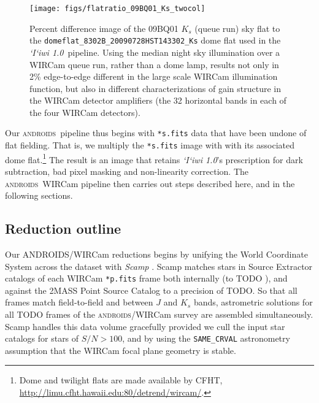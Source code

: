 \documentclass[iop]{emulateapj}
\newcommand{\sw}[1]{\textit{#1}} %
\newcommand{\iiwione}{\sw{`I`iwi 1.0}}
\newcommand{\androids}{\textsc{androids}}
\newcommand{\todo}[1]{\textcolor{BurntOrange}{\textsf{#1}}} %
\begin{document}
\begin{figure}[t]
   \centering
    \texttt{[image: figs/flatratio\_09BQ01\_Ks\_twocol]}
    \caption{Percent difference image of the 09BQ01 $K_s$ (queue run) sky flat to the \texttt{domeflat\_8302B\_20090728HST143302\_Ks} dome flat used in the \iiwione\ pipeline. Using the median night sky illumination over a WIRCam queue run, rather than a dome lamp, results not only in 2\% edge-to-edge different in the large scale WIRCam illumination function, but also in different characterizations of gain structure in the WIRCam detector amplifiers (the 32 horizontal bands in each of the four WIRCam detectors).}
   \label{fig:domeflatratio}
\end{figure}

\vspace{1em}

Our \androids\ pipeline thus begins with \texttt{*s.fits} data that have been undone of flat fielding.
That is, we multiply the \texttt{*s.fits} image with with its associated dome flat.\footnote{Dome and twilight flats are made available by CFHT, \url{http://limu.cfht.hawaii.edu:80/detrend/wircam/}.}
The result is an image that retains \iiwione's prescription for dark subtraction, bad pixel masking and non-linearity correction.
The \androids\ WIRCam pipeline then carries out steps described here, and in the following sections.

\subsection{Reduction outline}
\label{sec:reduction_outline}

Our ANDROIDS/WIRCam reductions begins by unifying the World Coordinate System across the dataset with \sw{Scamp} \citep{Bertin:2006}.
Scamp matches stars in Source Extractor \citep{Bertin:1996} catalogs of each WIRCam \texttt{*p.fits} frame both internally (to \todo{TODO} \arcsec ), and against the 2MASS Point Source Catalog \citep{Skrutskie:2006} to a precision of \todo{TODO}\arcsec.
So that all frames match field-to-field and between $J$ and $K_s$ bands, astrometric solutions for all \todo{TODO} frames of the \androids /WIRCam survey are assembled simultaneously.  Scamp handles this data volume gracefully provided we cull the input star catalogs for stars of $S/N > 100$, and by using the \texttt{SAME\_CRVAL} astronometry assumption that the WIRCam focal plane geometry is stable.
\end{document}
